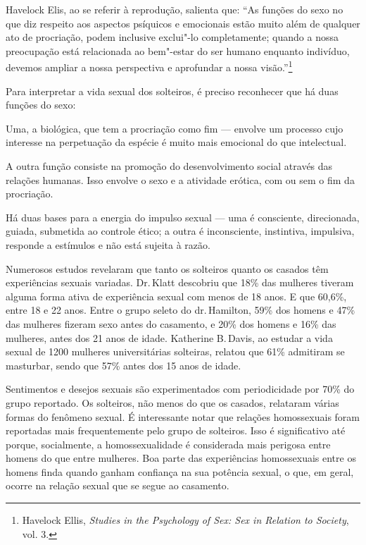Havelock Elis, ao se referir à reprodução, salienta que: ``As funções do
sexo no que diz respeito aos aspectos psíquicos e emocionais estão muito
além de qualquer ato de procriação, podem inclusive exclui"-lo
completamente; quando a nossa preocupação está relacionada ao
bem"-estar do ser humano enquanto indivíduo, devemos ampliar a nossa
perspectiva e aprofundar a nossa visão.''\footnote{Havelock Ellis,
  \textit{Studies in the Psychology of Sex: Sex in Relation to Society},
  vol. 3.}

Para interpretar a vida sexual dos solteiros, é preciso reconhecer que
há duas funções do sexo:

Uma, a biológica, que tem a procriação como fim --- envolve um processo cujo
interesse na perpetuação da espécie é muito mais emocional do que
intelectual.

A outra função consiste na promoção do desenvolvimento social através
das relações humanas. Isso envolve o sexo e a atividade erótica, com ou
sem o fim da procriação.

Há duas bases para a energia do impulso sexual --- uma é consciente,
direcionada, guiada, submetida ao controle ético; a outra é
inconsciente, instintiva, impulsiva, responde a estímulos e não está
sujeita à razão.


Numerosos estudos revelaram que tanto os solteiros quanto os casados
têm experiências sexuais variadas. Dr.\,Klatt descobriu que 18\% das
mulheres tiveram alguma forma ativa de experiência sexual com menos de
18 anos. E que 60,6\%, entre 18 e 22 anos. Entre o grupo seleto do dr.\,Hamilton, 59\% dos homens e 47\% das mulheres fizeram sexo antes do
casamento, e 20\% dos homens e 16\% das mulheres, antes dos 21 anos de
idade. Katherine B.\,Davis, ao estudar a vida sexual de 1200 mulheres
universitárias solteiras, relatou que 61\% admitiram se masturbar, sendo
que 57\% antes dos 15 anos de idade.

Sentimentos e desejos sexuais são experimentados com periodicidade por
70\% do grupo reportado. Os solteiros, não menos do que os
casados, relataram várias formas do fenômeno sexual. É interessante
notar que relações homossexuais foram reportadas mais frequentemente
pelo grupo de solteiros. Isso é significativo até porque, socialmente, a
homossexualidade é considerada mais perigosa entre homens do que entre
mulheres. Boa parte das experiências homossexuais entre os homens finda
quando ganham confiança na sua potência sexual, o que, em geral, ocorre na relação sexual que se segue ao casamento.

